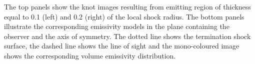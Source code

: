 The top panels show the knot images resulting from emitting region
of thickness equal to 0.1 (left) and 0.2 (right) of the local shock radius. The
bottom panels illustrate the corresponding emissivity models in the plane containing the observer and the axis of symmetry. The
dotted line shows the termination shock surface, the dashed line shows the line of
sight and the mono-coloured image shows the corresponding volume emissivity
distribution.